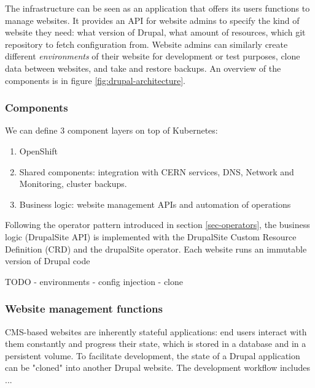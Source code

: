 The infrastructure can be seen as an application that offers its users functions to manage websites.
It provides an API for website admins to specify the kind of website they need: what version of Drupal, what amount of resources, which git repository to fetch configuration from.
Website admins can similarly create different \emph{environments} of their website for development or test purposes,
clone data between websites, and take and restore backups.
An overview of the components is in figure \ref{fig:drupal-architecture}.

\subsubsection{Components}

We can define 3 component layers on top of Kubernetes:
\begin{enumerate}
    \item OpenShift
    \item Shared components: integration with CERN services, DNS, Network and Monitoring, cluster backups.
    \item Business logic: website management APIs and automation of operations
\end{enumerate}

Following the operator pattern introduced in section \ref{sec-operators}, the business logic (DrupalSite API) is implemented with the DrupalSite Custom Resource Definition (CRD) and the drupalSite operator.
Each website runs an immutable version of Drupal code

TODO
- environments
- config injection
- clone






\subsubsection*{Website management functions}


CMS-based websites are inherently stateful applications: end users interact with them constantly and progress their state,
which is stored in a database and in a persistent volume.
To facilitate development, the state of a Drupal application can be "cloned" into another Drupal website.
The development workflow includes ... %

